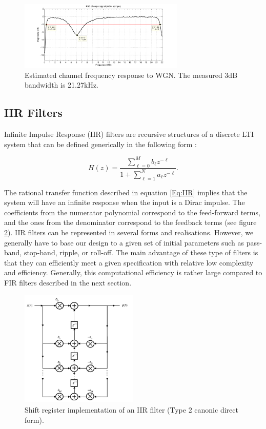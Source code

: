 \documentclass[12pt,a4paper,openright]{report}
\begin{document}
\begin{figure}[H]
\centering
\includegraphics[width=0.7\textwidth]{ChannelResponse.pdf}
\caption[Estimated channel frequency response to WGN]{Estimated channel frequency response to WGN. The measured 3dB bandwidth is 21.27kHz.}
\label{fig:channelresp}
\end{figure}


\subsection{IIR Filters}
Infinite Impulse Response (IIR) filters are recursive structures of a discrete LTI system that can be defined generically in the following form \cite{DSPDiniz}:

\begin{equation}\label{Eq:IIR}
H\left( z \right) = \frac{{\sum\limits_{\ell  = 0}^M {{b_\ell }{z^{ - \ell }}} }}{{1 + \sum\limits_{\ell = 1}^N {{a_\ell }{z^{ - \ell }}} }}.
\end{equation}

 The rational transfer function described in equation \ref{Eq:IIR} implies that the system will have an infinite response when the input is a Dirac impulse. The coefficients from the numerator polynomial correspond to the feed-forward terms, and the ones from the denominator correspond to the feedback terms (see figure \ref{fig:IIRimpl}). IIR filters can be represented in several forms and realisations. However, we generally have to base our design to a given set of initial parameters such as pass-band, stop-band, ripple, or roll-off. The main advantage of these type of filters is that they can efficiently meet a given specification with relative low complexity and efficiency.  Generally, this  computational efficiency is rather large compared to FIR filters described in the next section.
 
  \begin{figure}[H]
   \centering
     \includegraphics[width=0.5\textwidth]{IIRfilter.png}
     \caption[Shift register implementation of an IIR filter]{Shift register implementation of an IIR filter (Type 2 canonic direct form)\cite{DSPDiniz}.}
     \label{fig:IIRimpl}
 \end{figure}  
\end{document}
